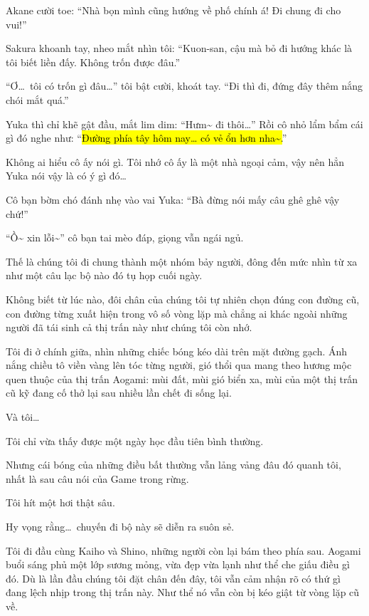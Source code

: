 \documentclass[../main.tex]{subfiles}
\begin{document}
Akane cười toe: ``Nhà bọn mình cũng hướng về phố chính á! Đi chung đi cho vui!''

Sakura khoanh tay, nheo mắt nhìn tôi: ``Kuon-san, cậu mà bỏ đi hướng khác là tôi biết liền đấy. Không trốn được đâu.''

``Ơ\dots\ tôi có trốn gì đâu\dots'' tôi bật cười, khoát tay. ``Đi thì đi, đứng đây thêm nắng chói mắt quá.''

Yuka thì chỉ khẽ gật đầu, mắt lim dim: ``Hưm\~{} đi thôi\dots'' Rồi cô nhỏ lẩm bẩm cái gì đó nghe như: ``\hl{Đường phía tây hôm nay\dots{} có vẻ ổn hơn nha\~{}.}''

Không ai hiểu cô ấy nói gì. Tôi nhớ cô ấy là một nhà ngoại cảm, vậy nên hẳn Yuka nói vậy là có ý gì đó\dots

Cô bạn bờm chó đánh nhẹ vào vai Yuka: ``Bà đừng nói mấy câu ghê ghê vậy chứ!''

``Ồ\~{} xin lỗi\~{}'' cô bạn tai mèo đáp, giọng vẫn ngái ngủ.

Thế là chúng tôi đi chung thành một nhóm bảy người, đông đến mức nhìn từ xa như một câu lạc bộ nào đó tụ họp cuối ngày.

Không biết từ lúc nào, đôi chân của chúng tôi tự nhiên chọn đúng con đường cũ, con đường từng xuất hiện trong vô số vòng lặp mà chẳng ai khác ngoài những người đã tái sinh cả thị trấn này như chúng tôi còn nhớ.

Tôi đi ở chính giữa, nhìn những chiếc bóng kéo dài trên mặt đường gạch. Ánh nắng chiều tô viền vàng lên tóc từng người, gió thổi qua mang theo hương mộc quen thuộc của thị trấn Aogami: mùi đất, mùi gió biển xa, mùi của một thị trấn cũ kỹ đang cố thở lại sau nhiều lần chết đi sống lại.

Và tôi\dots

Tôi chỉ vừa thấy được một ngày học đầu tiên bình thường.

Nhưng cái bóng của những điều bất thường vẫn lảng vảng đâu đó quanh tôi, nhất là sau câu nói của Game trong rừng.

Tôi hít một hơi thật sâu.

Hy vọng rằng\dots\ chuyến đi bộ này sẽ diễn ra suôn sẻ.

\ct

Tôi đi đầu cùng Kaiho và Shino, những người còn lại bám theo phía sau. Aogami buổi sáng phủ một lớp sương mỏng, vừa đẹp vừa lạnh như thể che giấu điều gì đó. Dù là lần đầu chúng tôi đặt chân đến đây, tôi vẫn cảm nhận rõ có thứ gì đang lệch nhịp trong thị trấn này. Như thể nó vẫn còn bị kéo giật từ vòng lặp cũ về.
\end{document}
